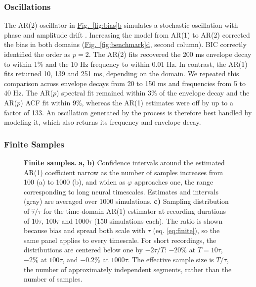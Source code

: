 \documentclass[pdflatex,lineno,sn-nature]{sn-jnl}
\newcommand{\figpanel}[3][]{\hyperref[#2]{Fig.~#1\ref*{#2}#3}}
\theoremstyle{thmstyleone}
\theoremstyle{thmstyletwo}
\theoremstyle{thmstylethree}
\begin{document}
\subsubsection{Oscillations}\label{sec:osc}

The AR(2) oscillator in \figpanel{fig:bias}{b} simulates a stochastic oscillation with phase and amplitude drift \cite{stralrowski_charts_1970, feingold_bursts_2015}. Increasing the model from AR(1) to AR(2) corrected the bias in both domains (\figpanel{fig:benchmark}{d}, second column). BIC correctly identified the order as $p=2$. The AR(2) fits recovered the 200 ms envelope decay to within 1\% and the 10 Hz frequency to within 0.01 Hz. In contrast, the AR(1) fits returned 10, 139 and 251 ms, depending on the domain. We repeated this comparison across envelope decays from 20 to 150 ms and frequencies from 5 to 40 Hz. The AR($p$) spectral fit remained within 3\% of the envelope decay and the AR($p$) ACF fit within 9\%, whereas the AR(1) estimates were off by up to a factor of 133. An oscillation generated by the process is therefore best handled by modeling it, which also returns its frequency and envelope decay.

\subsubsection{Finite Samples}\label{sec:finite}

\begin{figure}[htbp]
\centering

\caption{\textbf{Finite samples.} \textbf{a, b)} Confidence intervals around the estimated AR(1) coefficient narrow as the number of samples increases from 100 (a) to 1000 (b), and widen as $\varphi$ approaches one, the range corresponding to long neural timescales. Estimates and intervals (gray) are averaged over 1000 simulations. \textbf{c)} Sampling distribution of $\hat\tau/\tau$ for the time-domain AR(1) estimator at recording durations of $10\tau$, $100\tau$ and $1000\tau$ (150 simulations each). The ratio is shown because bias and spread both scale with $\tau$ (eq. \ref{eq:finite}), so the same panel applies to every timescale. For short recordings, the distributions are centered below one by $-2\tau/T$: $-20\%$ at $T = 10\tau$, $-2\%$ at $100\tau$, and $-0.2\%$ at $1000\tau$. The effective sample size is $T/\tau$, the number of approximately independent segments, rather than the number of samples.}
\label{fig:finite}
\end{figure}
\end{document}
